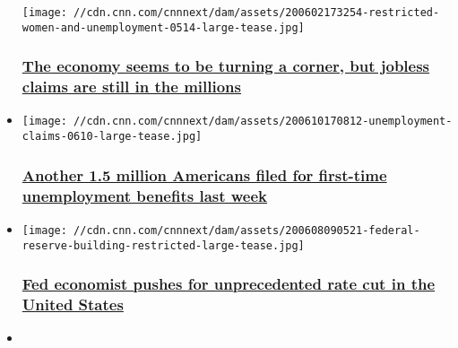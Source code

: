 \begin{itemize}
  \texttt{[image: //cdn.cnn.com/cnnnext/dam/assets/200602173254-restricted-women-and-unemployment-0514-large-tease.jpg]}

  \hypertarget{the-economy-seems-to-be-turning-a-corner-but-jobless-claims-are-still-in-the-millions}{%
  \subsubsection{\texorpdfstring{\href{/2020/06/18/economy/unemployment-benefits-coronavirus/index.html}{The
  economy seems to be turning a corner, but jobless claims are still in
  the
  millions}}{The economy seems to be turning a corner, but jobless claims are still in the millions}}\label{the-economy-seems-to-be-turning-a-corner-but-jobless-claims-are-still-in-the-millions}}
\item
  \href{/2020/06/11/economy/unemployment-benefits-coronavirus/index.html}{}

  \texttt{[image: //cdn.cnn.com/cnnnext/dam/assets/200610170812-unemployment-claims-0610-large-tease.jpg]}

  \hypertarget{another-15-million-americans-filed-for-first-time-unemployment-benefits-last-week}{%
  \subsubsection{\texorpdfstring{\href{/2020/06/11/economy/unemployment-benefits-coronavirus/index.html}{Another
  1.5 million Americans filed for first-time unemployment benefits last
  week}}{Another 1.5 million Americans filed for first-time unemployment benefits last week}}\label{another-15-million-americans-filed-for-first-time-unemployment-benefits-last-week}}
\item
  \href{/2020/06/08/investing/negative-rates-federal-reserve/index.html}{}

  \texttt{[image: //cdn.cnn.com/cnnnext/dam/assets/200608090521-federal-reserve-building-restricted-large-tease.jpg]}

  \hypertarget{fed-economist-pushes-for-unprecedented-rate-cut-in-the-united-states}{%
  \subsubsection{\texorpdfstring{\href{/2020/06/08/investing/negative-rates-federal-reserve/index.html}{Fed
  economist pushes for unprecedented rate cut in the United
  States}}{Fed economist pushes for unprecedented rate cut in the United States}}\label{fed-economist-pushes-for-unprecedented-rate-cut-in-the-united-states}}
\item
  \href{/2020/06/05/economy/may-jobs-report-2020-coronavirus/index.html}{}


\end{itemize}
